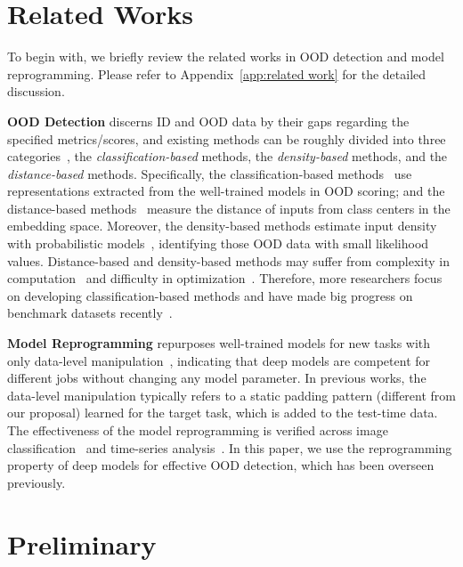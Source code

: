 \documentclass{article}
\begin{document}
\section{Related Works}

To begin with, we briefly review the related works in OOD detection and model reprogramming. Please refer to Appendix~\ref{app:related work} for the detailed discussion. 

\textbf{OOD Detection} discerns ID and OOD data by their gaps regarding the specified metrics/scores, and existing methods can be roughly divided into three categories~\cite{yang2021generalized}, the \emph{classification-based} methods, the \emph{density-based} methods, and the \emph{distance-based} methods. Specifically, the classification-based methods~\cite{hendrycks2016baseline,huang2021importance,liu2020energy,sastry2019detecting} use representations extracted from the well-trained models in OOD scoring; and the distance-based methods~\cite{ChenLSZ20,huang2020feature,zaeemzadeh2021out} measure the distance of inputs from class centers in the embedding space. Moreover, the density-based methods estimate input density with probabilistic models~\cite{lee2018simple,RenLFSPDDL19,SerraAGSNL20}, identifying those OOD data with small likelihood values. Distance-based and density-based methods may suffer from complexity in computation~\cite{lee2018simple} and difficulty in optimization~\cite{ZhangGR21}. Therefore, more researchers focus on developing classification-based methods and have made big progress on benchmark datasets recently~\cite{huang2021importance,liu2020energy}.





\textbf{Model Reprogramming} repurposes well-trained models for new tasks with only data-level manipulation~\cite{elsayed2018adversarial}, indicating that deep models are competent for different jobs without changing any model parameter. In previous works, the data-level manipulation typically refers to a static padding pattern (different from our proposal) learned for the target task, which is added to the test-time data. The effectiveness of the model reprogramming is verified across image classification~\cite{elsayed2018adversarial,TsaiCH20} and time-series analysis~\cite{hambardzumyan2021warp,YangTC21}. In this paper, we use the reprogramming property of deep models for effective OOD detection, which has been overseen previously. 

\section{Preliminary} \label{sec: related work}
\end{document}
